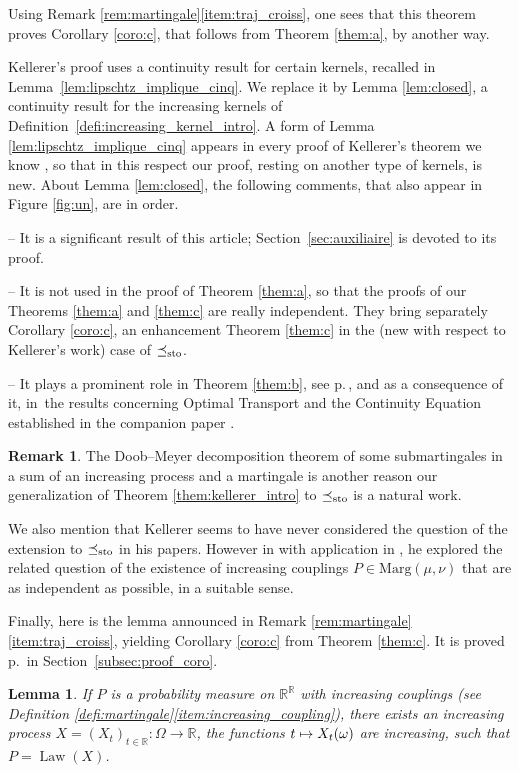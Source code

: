 \documentclass[JEP,XML,SOM,Unicode,NoEqCountersInSection,NoFloatCountersInSection,published]{cedram}
\newcommand\mto{\mathchoice{\longmapsto}{\mapsto}{\mapsto}{\mapsto}}
\theoremstyle{plain}
\newtheorem{lem}[them]{Lemma}
\theoremstyle{definition}
\newtheorem{rem}[them]{Remark}
\newcommand{\ma}{\mathrm{Marg}}
\newcommand{\R}{\mathbb{R}}
\newcommand{\law}{\operatorname{Law}}
\newcommand{\leqs}{\preceq_{\text{\rm sto}}}
\begin{document}
Using Remark \ref{rem:martingale}\eqref{item:traj_croiss}, one sees that this theorem proves Corollary \ref{coro:c}, that follows from Theorem \ref{them:a}, by another way.

Kellerer's proof uses a continuity result for certain kernels, recalled in Lemma~\ref{lem:lipschtz_implique_cinq}. We replace it by Lemma \ref{lem:closed}, a continuity result for the increasing kernels of Definition~\ref{defi:increasing_kernel_intro}. A form of Lemma \ref{lem:lipschtz_implique_cinq} appears in every proof of Kellerer's theorem we know \cite{Ke72,Ke73,Low,HiRoYo14,BHS}, so that in this respect our proof, resting on another type of kernels, is new. About Lemma \ref{lem:closed}, the following comments, that also appear in Figure \ref{fig:un}, are in order.

-- It is a significant result of this article; Section~\ref{sec:auxiliaire} is devoted to its proof.

-- It is not used in the proof of Theorem \ref{them:a}, so that the proofs of our Theorems \ref{them:a} and \ref{them:c} are really independent. They bring separately Corollary \ref{coro:c}, an enhancement Theorem \ref{them:c} in the (new with respect to Kellerer's work) case of $\leqs$.

-- It plays a prominent role in Theorem \ref{them:b}, see p.\,\pageref{appel_lemme_closed}, and as a consequence of it, in~the results concerning Optimal Transport and the Continuity Equation established in the companion paper \cite{BouJui2}.

\begin{rem}The Doob--Meyer decomposition theorem of some submartingales in a sum of an increasing process and a martingale is another reason our generalization of Theorem \ref{them:kellerer_intro} to $\leqs$ is a natural work.
\end{rem}

We also mention that Kellerer seems to have never considered the question of the extension to $\leqs$ in his papers. However in \cite{Ke86} with application in \cite{Ke87}, he explored the related question of the existence of increasing couplings $P\in \ma(\mu,\nu)$ that are as independent as possible, in a suitable sense.

Finally, here is the lemma announced in Remark \ref{rem:martingale}\eqref{item:traj_croiss}, yielding Corollary \ref{coro:c} from Theorem \ref{them:c}. It is proved p.\,\pageref{subsec:proof_coro} in Section~\ref{subsec:proof_coro}.

\begin{lem}\label{coro}If $P$ is a probability measure on $\R^\R$ with increasing couplings (see Definition \ref{defi:martingale}\eqref{item:increasing_coupling}), there exists an increasing process $X=(X_t)_{t\in\R}:\Omega\to\R$, \ie the functions $t\mto X_t(\omega)$ are increasing, such that $P=\law(X)$.
\end{lem}
\end{document}
